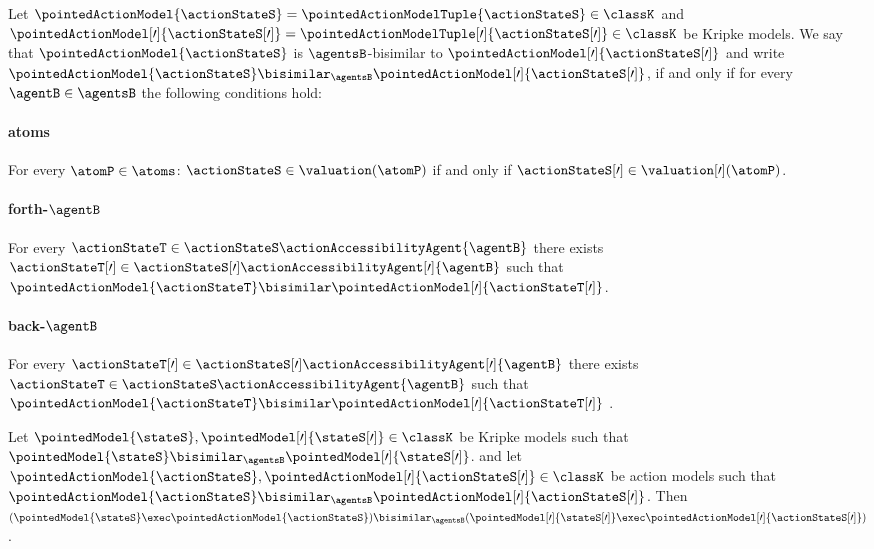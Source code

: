 \documentclass[twoside]{aiml14}
\begin{document}
  \begin{definition}
      Let $\pointedActionModel{\actionStateS} = \pointedActionModelTuple{\actionStateS} \in \classK$ 
      and $\pointedActionModel[\prime]{\actionStateS[\prime]} = \pointedActionModelTuple[\prime]{\actionStateS[\prime]} \in \classK$
      be Kripke models. 
      We say that $\pointedActionModel{\actionStateS}$ is $\agentsB$-bisimilar
      to $\pointedActionModel[\prime]{\actionStateS[\prime]}$ 
      and write $\pointedActionModel{\actionStateS} \bisimilar_\agentsB \pointedActionModel[\prime]{\actionStateS[\prime]}$,
      if and only if
      for every $\agentB \in \agentsB$ the following conditions hold:

      \paragraph{atoms}
      For every $\atomP \in \atoms$: $\actionStateS \in \valuation(\atomP)$ if and only if $\actionStateS[\prime] \in \valuation[\prime](\atomP)$.

      \paragraph{forth-$\agentB$}
      For every $\actionStateT \in \actionStateS \actionAccessibilityAgent{\agentB}$ 
      there exists $\actionStateT[\prime] \in \actionStateS[\prime] \actionAccessibilityAgent[\prime]{\agentB}$
      such that $\pointedActionModel{\actionStateT} \bisimilar \pointedActionModel[\prime]{\actionStateT[\prime]}$.

      \paragraph{back-$\agentB$}
      For every $\actionStateT[\prime] \in \actionStateS[\prime] \actionAccessibilityAgent[\prime]{\agentB}$
      there exists $\actionStateT \in \actionStateS \actionAccessibilityAgent{\agentB}$ 
      such that $\pointedActionModel{\actionStateT} \bisimilar \pointedActionModel[\prime]{\actionStateT[\prime]}$ .
  \end{definition}

  \begin{proposition}
      Let $\pointedModel{\stateS}, \pointedModel[\prime]{\stateS[\prime]} \in \classK$ be Kripke models such that
      $\pointedModel{\stateS} \bisimilar_\agentsB \pointedModel[\prime]{\stateS[\prime]}$. 
      and let $\pointedActionModel{\actionStateS}, \pointedActionModel[\prime]{\actionStateS[\prime]} \in \classK$ be action models such that
      $\pointedActionModel{\actionStateS} \bisimilar_\agentsB \pointedActionModel[\prime]{\actionStateS[\prime]}$.
      Then
      $(\pointedModel{\stateS} \exec \pointedActionModel{\actionStateS}) \bisimilar_\agentsB (\pointedModel[\prime]{\stateS[\prime]} \exec \pointedActionModel[\prime]{\actionStateS[\prime]})$.
  \end{proposition}
\end{document}
